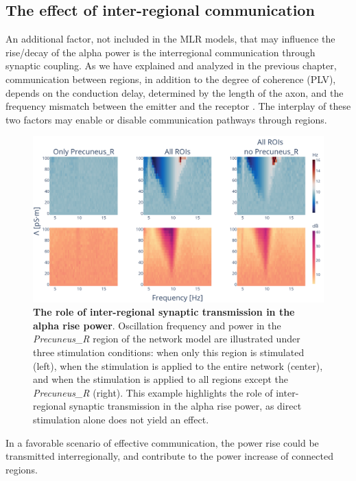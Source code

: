 \documentclass[../main.tex]{subfiles}
\begin{document}
\subsection{The effect of inter-regional communication}
An additional factor, not included in the MLR models, that may influence the rise/decay of the alpha power is the interregional communication through synaptic coupling.
As we have explained and analyzed in the previous chapter, communication between regions, in addition to the degree of coherence (PLV), depends on the conduction delay, determined by the length of the axon, and the frequency mismatch between the emitter and the receptor \citep{pariz_transmission_2021,sanchez-claros_information_2021}.
The interplay of these two factors may enable or disable communication pathways through regions.
\begin{figure}[!htb]
    \centering
    \includegraphics[width=\textwidth]{chapter3/figures/effect_of_neighboor_stimulation.png}
        \caption{\textbf{The role of inter-regional synaptic transmission in the alpha rise power}.
        Oscillation frequency and power in the \textit{Precuneus\_R} region of the network model are illustrated under three stimulation conditions: when only this region is stimulated (left), when the stimulation is applied to the entire network (center), and when the stimulation is applied to all regions except the \textit{Precuneus\_R} (right).
        This example highlights the role of inter-regional synaptic transmission in the alpha rise power, as direct stimulation alone does not yield an effect.}
    \label{fig:effect-of-interregion-stimulation}
\end{figure}
In a favorable scenario of effective communication, the power rise could be transmitted interregionally, and contribute to the power increase of connected regions.
\end{document}
